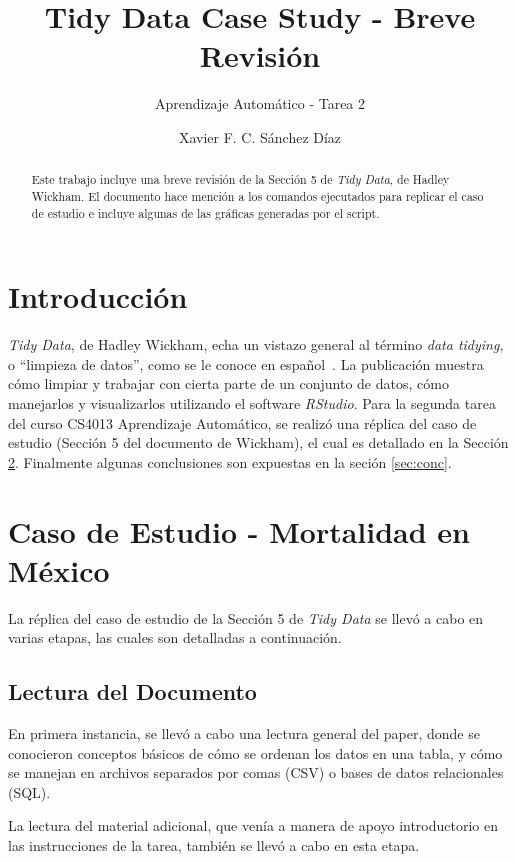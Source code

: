 \documentclass{llncs}
\title{Tidy Data Case Study - Breve Revisión}
\subtitle{Aprendizaje Automático - Tarea 2}
\author{Xavier F. C. Sánchez Díaz\inst{1}}
\institute{Tecnológico de Monterrey \\
\email{<A01170065@itesm.mx>}}
\begin{document}
\maketitle
\begin{abstract}
Este trabajo incluye una breve revisión de la Sección 5 de \textit{Tidy Data}, de Hadley Wickham.
El documento hace mención a los comandos ejecutados para replicar el caso de estudio e incluye algunas de las gráficas generadas por el script.
\end{abstract}

\section{Introducción}
\label{sec:intro}

\textit{Tidy Data}, de Hadley Wickham, echa un vistazo general al término \textit{data tidying}, o ``limpieza de datos'', como se le conoce en español~\cite{JSSv059i10}.
La publicación muestra cómo limpiar y trabajar con cierta parte de un conjunto de datos, cómo manejarlos y visualizarlos utilizando el software \textit{RStudio}.
Para la segunda tarea del curso CS4013 Aprendizaje Automático, se realizó una réplica del caso de estudio (Sección 5 del documento de Wickham), el cual es detallado en la Sección \ref{sec:case}.
Finalmente algunas conclusiones son expuestas en la seción \ref{sec:conc}.

\section{Caso de Estudio - Mortalidad en México}
\label{sec:case}

La réplica del caso de estudio de la Sección 5 de \textit{Tidy Data} se llevó a cabo en varias etapas, las cuales son detalladas a continuación.

\subsection{Lectura del Documento}
\label{subsec:read}

En primera instancia, se llevó a cabo una lectura general del paper,
donde se conocieron conceptos básicos de cómo se ordenan los datos en una tabla,
y cómo se manejan en archivos separados por comas (CSV) o bases de datos relacionales (SQL).

La lectura del material adicional, que venía a manera de apoyo introductorio en las instrucciones de la tarea, también se llevó a cabo en esta etapa.
\end{document}
